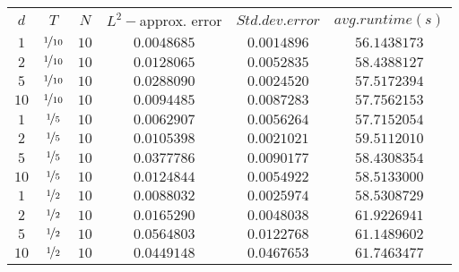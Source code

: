 \begin{tabular}{cccccc}
$d$ & $T$ & $N$ & $L^2-$approx. error & $Std. dev. error$ & $avg. runtime (s)$\\
$1$ & $\nicefrac{1}{10}$ & $10$ & $0.0048685$ & $0.0014896$ & $56.1438173$\\
$2$ & $\nicefrac{1}{10}$ & $10$ & $0.0128065$ & $0.0052835$ & $58.4388127$\\
$5$ & $\nicefrac{1}{10}$ & $10$ & $0.0288090$ & $0.0024520$ & $57.5172394$\\
$10$ & $\nicefrac{1}{10}$ & $10$ & $0.0094485$ & $0.0087283$ & $57.7562153$\\
$1$ & $\nicefrac{1}{5}$ & $10$ & $0.0062907$ & $0.0056264$ & $57.7152054$\\
$2$ & $\nicefrac{1}{5}$ & $10$ & $0.0105398$ & $0.0021021$ & $59.5112010$\\
$5$ & $\nicefrac{1}{5}$ & $10$ & $0.0377786$ & $0.0090177$ & $58.4308354$\\
$10$ & $\nicefrac{1}{5}$ & $10$ & $0.0124844$ & $0.0054922$ & $58.5133000$\\
$1$ & $\nicefrac{1}{2}$ & $10$ & $0.0088032$ & $0.0025974$ & $58.5308729$\\
$2$ & $\nicefrac{1}{2}$ & $10$ & $0.0165290$ & $0.0048038$ & $61.9226941$\\
$5$ & $\nicefrac{1}{2}$ & $10$ & $0.0564803$ & $0.0122768$ & $61.1489602$\\
$10$ & $\nicefrac{1}{2}$ & $10$ & $0.0449148$ & $0.0467653$ & $61.7463477$\\
\end{tabular}
